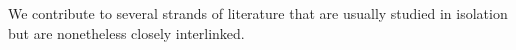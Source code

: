



We contribute to several strands of literature that are usually studied in isolation but are nonetheless closely interlinked.


